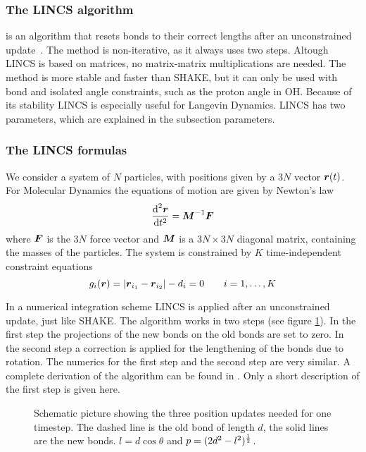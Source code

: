 \newcommand{\fs}{\begin{equation} \label}
\newcommand{\fe}{\end{equation}}
\newcommand{\p}{\partial}
\newcommand{\Bm}{\ve{B}}
\newcommand{\M}{\ve{M}}
\newcommand{\iM}{\M^{-1}}
\newcommand{\Tm}{\ve{T}}
\newcommand{\Sm}{\ve{S}}
\newcommand{\fo}{\ve{f}}
\newcommand{\con}{\ve{g}}
\newcommand{\lenc}{\ve{d}}

\subsubsection*{The LINCS algorithm}
 is an algorithm that resets bonds to their correct lengths
after an unconstrained update~\cite{Hess97}. 
The method is non-iterative, as it always uses two steps.
Altough LINCS is based on matrices, no matrix-matrix multiplications are 
needed. The method is more stable and faster than SHAKE, 
but it can only be used with bond  and 
isolated angle constraints, such as the proton angle in OH. 
Because of its stability LINCS is especially useful for Langevin Dynamics. 
LINCS has two parameters, which are explained in the subsection parameters.
 
\subsubsection*{The LINCS formulas}
We consider a system of $N$ particles, with positions given by a
$3N$ vector $\mbox{\boldmath ${r}$}(t)$.
For Molecular Dynamics the equations of motion are given by Newton's law
\fs{c1}
{\de^2 \ve{r} \over \de t^2} = \iM \ve{F}
\fe
where $\mbox{\boldmath ${F}$}$ is the $3N$ force vector 
and $\M$ is a $3N \times 3N$ diagonal matrix,
containing the masses of the particles.
The system is constrained by $K$ time-independent constraint equations
\fs{c2}
g_i(\ve{r}) = | \ve{r}_{i_1}-\ve{r}_{i_2} | - d_i = 0 ~~~~~~i=1,\ldots,K
\fe

In a numerical integration scheme LINCS is applied after an
unconstrained update, just like SHAKE. The algorithm works in two
steps (see figure \ref{lincs_fig}). In the first step the projections
of the new bonds on the old bonds are set to zero. In the second step
a correction is applied for the lengthening of the bonds due to
rotation. The numerics for the first step and the second step are very
similar. A complete derivation of the algorithm can be found in
\cite{Hess97}. Only a short description of the first step is given
here.

\begin{figure}
\centerline{}
\caption[Schematic picture showing the three position updates needed 
for one timestep.]{Schematic picture showing the three position
updates needed for one timestep. The dashed line is the old bond of
length $d$, the solid lines are the new bonds. $l=d \cos \theta$ and
$p=(2 d^2 - l^2)^{1 \over 2}$.}
\label{lincs_fig}
\end{figure}

